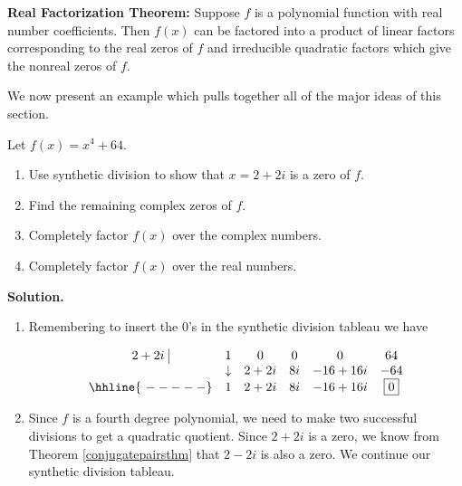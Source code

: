 \smallskip

\colorbox{ResultColor}{\bbm
\begin{thm}\label{realfactorization}\textbf{Real Factorization Theorem:} Suppose $f$ is a polynomial function with real number coefficients.  Then $f(x)$ can be factored into a product of linear factors corresponding to the real zeros of $f$ and irreducible quadratic factors which give the nonreal zeros of $f$. 
\end{thm}
\ebm}

\smallskip

We now present an example which pulls together all of the major ideas of this section.

\begin{ex}  Let $f(x) = x^4+64$.  

\begin{enumerate}

\item  Use synthetic division to show that $x=2+2i$ is a zero of $f$.

\item  Find the remaining complex zeros of $f$.

\item  Completely factor $f(x)$ over the complex numbers.

\item  Completely factor $f(x)$ over the real numbers.

\end{enumerate}

{ \bf Solution.}

\begin{enumerate}

\item  Remembering to insert the $0$'s in the synthetic division tableau we have

\[ \begin{array}{cccccc}
 2+2i \, \, \vline& 1 & 0 & 0  & 0 & 64 \\

  & \downarrow     &  2+2i  &  8i & -16+16i & -64\\ \hhline{~-----} 
  
               & 1 &  2+2i  & 8i & -16+16i &  \fbox{$0$}  \\ \end{array}\]



\item  Since $f$ is a fourth degree polynomial, we need to make two successful divisions to get a quadratic quotient.  Since $2+2i$ is a zero, we know from Theorem \ref{conjugatepairsthm} that $2-2i$ is also a zero.  We continue our synthetic division tableau.


\end{enumerate}
\end{ex}
